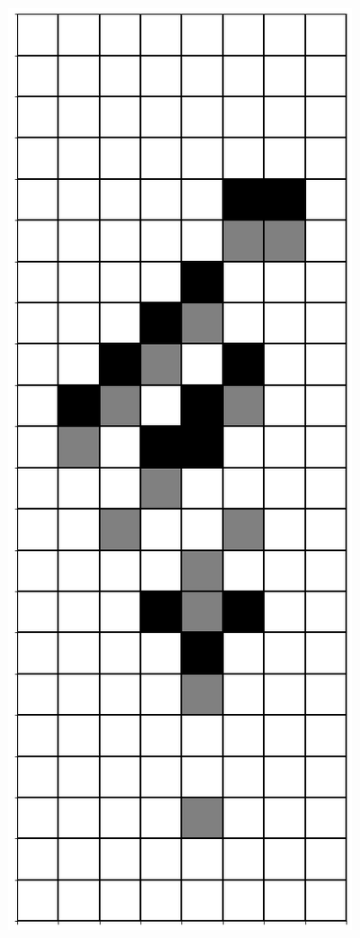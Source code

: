 \documentclass[12pt]{article}
\numberwithin{figure}{section} %
\begin{document}
\begin{figure}[H]
\begin{subfigure}{0.18\textwidth}
     		\subcaption{}
   	\end{subfigure}
     	\begin{subfigure}{0.18\textwidth}
    		\centering
     		\includegraphics[width=\linewidth]{Section4/20.1}

\end{subfigure}
\end{figure}
\end{document}
